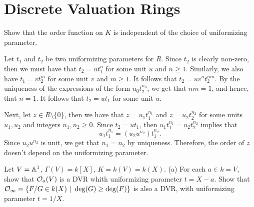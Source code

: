 \section{Discrete Valuation Rings}

\begin{exercise}
    Show that the order function on $K$ is independent of the choice of uniformizing parameter. \\
\end{exercise}

\begin{solution}
    Let $t_1$ and $t_2$ be two uniformizing parameters for $R$. Since $t_2$ is clearly non-zero, then we must have that $t_2 = ut_1^{n}$ for some unit $u$ and $n \geq 1$. Similarly, we also have $t_1 = vt_2^{m}$ for some unit $v$ and $m \geq 1$. It follows that $t_2 = uv^nt_2^{nm}$. By the uniqueness of the expressions of the form $u_0t_2^{n_0}$, we get that $nm = 1$, and hence, that $n = 1$. It follows that $t_2 = ut_1$ for some unit $u$.
    
    Next, let $z \in R\setminus\{0\}$, then we have that $z = u_1t_1^{n_1}$ and $z = u_2 t_2^{n_2}$ for some units $u_1,u_2$ and integers $n_1, n_2 \geq 0$. Since $t_2 = ut_1$, then $u_1t_1^{n_1} = u_2t_2^{n_2}$ implies that
    $$u_1t_1^{n_1} = (u_2u^{n_2})t_1^{n_2}.$$
    Since $u_2u^{n_2}$ is unit, we get that $n_1 = n_2$ by uniqueness. Therefore, the order of $z$ doesn't depend on the uniformizing parameter. \\
\end{solution}

\begin{exercise}
    Let $V = \mathbb{A}^1$, $\Gamma(V) = k[X]$, $K = k(V) = k(X)$. (a) For each $a \in k = V$, show that $\mathcal{O}_a(V)$ is a DVR whith uniformizing parameter $t = X-a$. Show that $\O_{\infty} = \{F/G \in k(X) \ | \ \deg(G) \geq \deg(F)\}$ is also a DVR, with uniformizing parameter $t = 1/X$. \\
\end{exercise}

